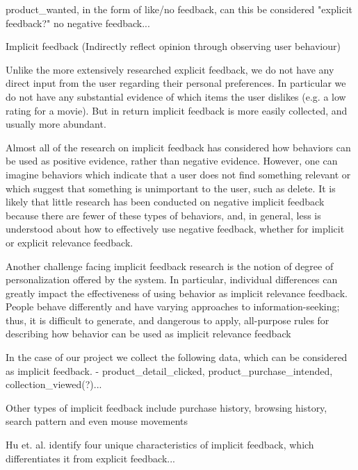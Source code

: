 product\_wanted, in the form of like/no feedback, can this be considered
"explicit feedback?" no negative feedback...

Implicit feedback (Indirectly reflect opinion through observing user behaviour)

Unlike the more extensively researched explicit feedback, we do not have any
direct input from the user regarding their personal preferences. In particular
we do not have any substantial evidence of which items the user dislikes (e.g. a
low rating for a movie). But in return implicit feedback is more easily
collected, and usually more abundant.

Almost all of the research on implicit feedback has considered how behaviors can
be used as positive evidence, rather than negative evidence. However, one can imagine
behaviors which indicate that a user does not find something relevant or which suggest
that something is unimportant to the user, such as delete. It is likely that little research
has been conducted on negative implicit feedback because there are fewer of these types
of behaviors, and, in general, less is understood about how to effectively use negative
feedback, whether for implicit or explicit relevance feedback.

Another challenge facing implicit feedback research is the notion of degree of
personalization offered by the system. In particular, individual differences can greatly
impact the effectiveness of using behavior as implicit relevance feedback. People behave
differently and have varying approaches to information-seeking; thus, it is difficult to
generate, and dangerous to apply, all-purpose rules for describing how behavior can be
used as implicit relevance feedback


In the case of our project we collect the following data, which can be
considered as implicit feedback.  - product\_detail\_clicked,
product\_purchase\_intended, collection\_viewed(?)...

Other types of implicit feedback include purchase history, browsing
history, search pattern and even mouse movements

Hu et. al. \cite{Hu2008} identify four unique characteristics of implicit
feedback, which differentiates it from explicit feedback...

